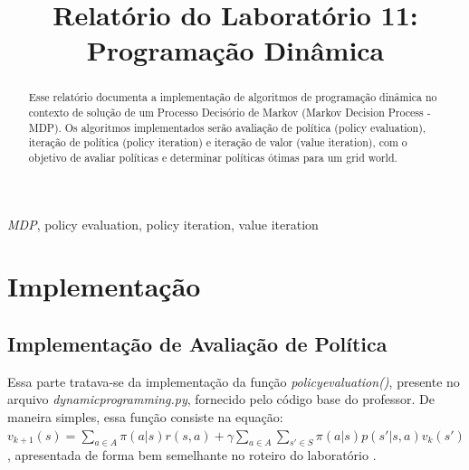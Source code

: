 \documentclass[conference]{IEEEtran}
\begin{document}
\title{Relatório do Laboratório 11: \\ Programação Dinâmica\\
}

\author{
}

\maketitle

\begin{abstract}
Esse relatório documenta a implementação de algoritmos de programação dinâmica no contexto de solução de um Processo Decisório de Markov (Markov Decision Process - MDP). Os algoritmos implementados serão avaliação de política (policy evaluation), iteração de política (policy iteration) e iteração de valor (value iteration), com o objetivo de avaliar políticas e determinar políticas ótimas para um grid world.
\end{abstract}

\begin{IEEEkeywords}
\textit{MDP}, policy evaluation, policy iteration, value iteration
\end{IEEEkeywords}

\section{Implementação}

\subsection{Implementação de Avaliação de Política}
Essa parte tratava-se da implementação da função \textit{policy\underline{\space}evaluation()}, presente no arquivo \textit{dynamic\underline{\space}programming.py}, fornecido pelo código base do professor. De maneira simples, essa função consiste na equação: $v_{k+1}\left ( s \right ) = \sum_{a\in A} \pi \left ( a|s \right ) r \left ( s, a \right ) + \gamma \sum_{a\in A} \sum_{s'\in S} \pi \left ( a|s \right ) p \left ( s' | s, a \right ) v_k \left ( s' \right )$, apresentada de forma bem semelhante no roteiro do laboratório \cite{roteiro}.
\end{document}
